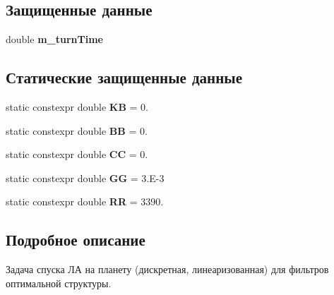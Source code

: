 \subsection*{Защищенные данные}
\begin{DoxyCompactItemize}
\item 
\hypertarget{class_tasks_1_1_discrete_1_1_landing_linear_a95cd1d6b8774484348cf21842bc1ab82}{}\label{class_tasks_1_1_discrete_1_1_landing_linear_a95cd1d6b8774484348cf21842bc1ab82} 
double {\bfseries m\+\_\+turn\+Time}
\end{DoxyCompactItemize}
\subsection*{Статические защищенные данные}
\begin{DoxyCompactItemize}
\item 
\hypertarget{class_tasks_1_1_discrete_1_1_landing_linear_ab62185db94c68bc2ea5449b455b71ca9}{}\label{class_tasks_1_1_discrete_1_1_landing_linear_ab62185db94c68bc2ea5449b455b71ca9} 
static constexpr double {\bfseries KB} = 0.
\item 
\hypertarget{class_tasks_1_1_discrete_1_1_landing_linear_a27e46b3c8f6359b7fe37205fe6d4b009}{}\label{class_tasks_1_1_discrete_1_1_landing_linear_a27e46b3c8f6359b7fe37205fe6d4b009} 
static constexpr double {\bfseries BB} = 0.
\item 
\hypertarget{class_tasks_1_1_discrete_1_1_landing_linear_ae2d5423e0cc942b236f97b55d16070b2}{}\label{class_tasks_1_1_discrete_1_1_landing_linear_ae2d5423e0cc942b236f97b55d16070b2} 
static constexpr double {\bfseries CC} = 0.
\item 
\hypertarget{class_tasks_1_1_discrete_1_1_landing_linear_a54a6e7e6668dae1ba3e700f633031b34}{}\label{class_tasks_1_1_discrete_1_1_landing_linear_a54a6e7e6668dae1ba3e700f633031b34} 
static constexpr double {\bfseries GG} = 3.\+E-\/3
\item 
\hypertarget{class_tasks_1_1_discrete_1_1_landing_linear_a5de434a509158bf23cb5fba7445b2e2d}{}\label{class_tasks_1_1_discrete_1_1_landing_linear_a5de434a509158bf23cb5fba7445b2e2d} 
static constexpr double {\bfseries RR} = 3390.
\end{DoxyCompactItemize}


\subsection{Подробное описание}
Задача спуска ЛА на планету (дискретная, линеаризованная) для фильтров оптимальной структуры. 

